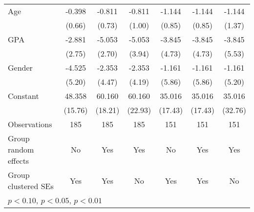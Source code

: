 {\begin{tabular}{l*{6}{c}}
Age                 &      -0.398         &      -0.811         &      -0.811         &      -1.144         &      -1.144         &      -1.144         \\
                    &      (0.66)         &      (0.73)         &      (1.00)         &      (0.85)         &      (0.85)         &      (1.37)         \\
GPA                 &      -2.881         &      -5.053\sym{*}  &      -5.053         &      -3.845         &      -3.845         &      -3.845         \\
                    &      (2.75)         &      (2.70)         &      (3.94)         &      (4.73)         &      (4.73)         &      (5.53)         \\
Gender              &      -4.525         &      -2.353         &      -2.353         &      -1.161         &      -1.161         &      -1.161         \\
                    &      (5.20)         &      (4.47)         &      (4.19)         &      (5.86)         &      (5.86)         &      (5.20)         \\
Constant            &      48.358\sym{***}&      60.160\sym{***}&      60.160\sym{***}&      35.016\sym{**} &      35.016\sym{**} &      35.016         \\
                    &     (15.76)         &     (18.21)         &     (22.93)         &     (17.43)         &     (17.43)         &     (32.76)         \\
\midrule
Observations        &         185         &         185         &         185         &         151         &         151         &         151         \\
Group random effects&          No         &         Yes         &         Yes         &          No         &         Yes         &         Yes         \\
Group clustered SEs &         Yes         &         Yes         &          No         &         Yes         &         Yes         &          No         \\
\bottomrule
\multicolumn{7}{l}{\footnotesize \sym{*} \(p<0.10\), \sym{**} \(p<0.05\), \sym{***} \(p<0.01\)}\\
\end{tabular}
}
